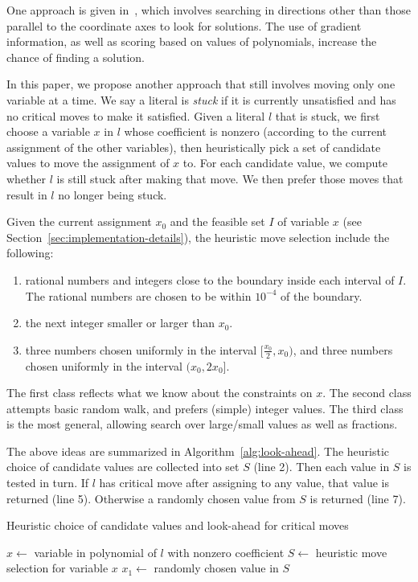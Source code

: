 \documentclass[runningheads]{llncs}
\begin{document}
One approach is given in~\cite{LiXZ23}, which involves searching in directions other than those parallel to the coordinate axes to look for solutions. The use of gradient information, as well as scoring based on values of polynomials, increase the chance of finding a solution.

In this paper, we propose another approach that still involves moving only one variable at a time. We say a literal is \emph{stuck} if it is currently unsatisfied and has no critical moves to make it satisfied. Given a literal $l$ that is stuck, we first choose a variable $x$ in $l$ whose coefficient is nonzero (according to the current assignment of the other variables), then heuristically pick a set of candidate values to move the assignment of $x$ to. For each candidate value, we compute whether $l$ is still stuck after making that move. We then prefer those moves that result in $l$ no longer being stuck.

Given the current assignment $x_0$ and the feasible set $I$ of variable $x$ (see Section~\ref{sec:implementation-details}), the heuristic move selection include the following:
\begin{enumerate}
    \item rational numbers and integers close to the boundary inside each interval of $I$. The rational numbers are chosen to be within $10^{-4}$ of the boundary.
    \item the next integer smaller or larger than $x_0$.
    \item three numbers chosen uniformly in the interval $[\frac{x_0}{2},x_0)$, and three numbers chosen uniformly in the interval $(x_0,2x_0]$.
\end{enumerate}

The first class reflects what we know about the constraints on $x$. The second class attempts basic random walk, and prefers (simple) integer values. The third class is the most general, allowing search over large/small values as well as fractions. 

The above ideas are summarized in Algorithm~\ref{alg:look-ahead}. The heuristic choice of candidate values are collected into set $S$ (line 2). Then each value in $S$ is tested in turn. If $l$ has critical move after assigning to any value, that value is returned (line 5). Otherwise a randomly chosen value from $S$ is returned (line 7).

\begin{algorithm}
\caption{Heuristic choice of candidate values and look-ahead for critical moves}
\label{alg:look-ahead}
$x \leftarrow$ variable in polynomial of $l$ with nonzero coefficient\;
$S \leftarrow $ heuristic move selection for variable $x$\;
$x_1 \leftarrow$ randomly chosen value in $S$\;
\end{algorithm}
\end{document}

